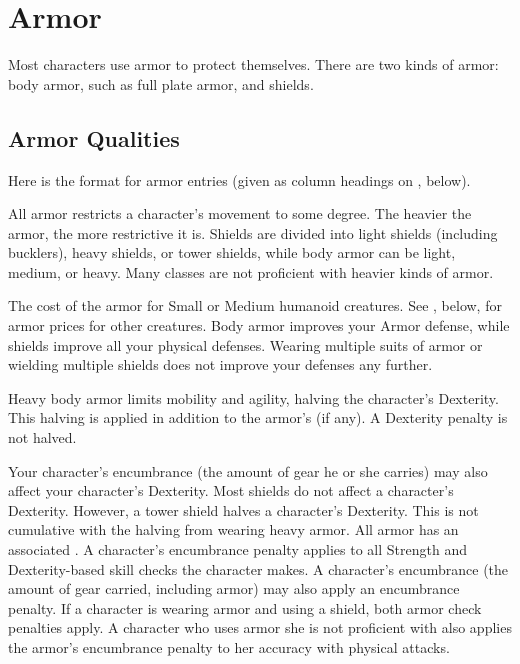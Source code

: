 \section{Armor}

Most characters use armor to protect themselves. There are two kinds of armor: body armor, such as full plate armor, and shields.

\subsection{Armor Qualities}
\par Here is the format for armor entries (given as column headings on , below).

 All armor restricts a character's movement to some degree. The heavier the armor, the more restrictive it is. Shields are divided into light shields (including bucklers), heavy shields, or tower shields, while body armor can be light, medium, or heavy. Many classes are not proficient with heavier kinds of armor.

 The cost of the armor for Small or Medium humanoid
creatures. See , below, for armor prices for other creatures.
 Body armor improves your Armor defense, while shields improve all your physical defenses. Wearing multiple suits of armor or wielding multiple shields does not improve your defenses any further.

 Heavy body armor limits mobility and agility, halving the character's Dexterity. This halving is applied in addition to the armor's  (if any). A Dexterity penalty is not halved.

Your character's encumbrance (the amount of gear he or she carries) may also affect your character's Dexterity.
 Most shields do not affect a character's Dexterity. However, a tower shield halves a character's Dexterity. This is not cumulative with the halving from wearing heavy armor.
 All armor has an associated .
A character's encumbrance penalty applies to all Strength and Dexterity-based skill checks the character makes.
A character's encumbrance (the amount of gear carried, including armor) may also apply an encumbrance penalty.
 If a character is wearing armor and using a shield, both armor check penalties apply.
 A character who uses armor she is not proficient with also applies the armor's encumbrance penalty to her accuracy with physical attacks.

